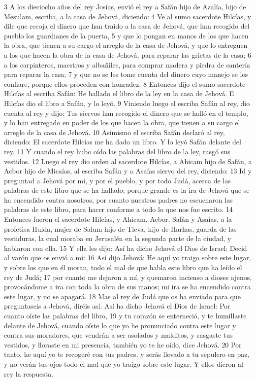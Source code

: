 3 A los dieciocho años del rey Josías, envió el rey a Safán hijo de Azalía, hijo de Mesulam, escriba, a la casa de Jehová, diciendo:
4 Ve al sumo sacerdote Hilcías, y dile que recoja el dinero que han traído a la casa de Jehová, que han recogido del pueblo los guardianes de la puerta,
5 y que lo pongan en manos de los que hacen la obra, que tienen a su cargo el arreglo de la casa de Jehová, y que lo entreguen a los que hacen la obra de la casa de Jehová, para reparar las grietas de la casa;
6 a los carpinteros, maestros y albañiles, para comprar madera y piedra de cantería para reparar la casa;
7 y que no se les tome cuenta del dinero cuyo manejo se les confiare, porque ellos proceden con honradez.
8 Entonces dijo el sumo sacerdote Hilcías al escriba Safán: He hallado el libro de la ley en la casa de Jehová. E Hilcías dio el libro a Safán, y lo leyó.
9 Viniendo luego el escriba Safán al rey, dio cuenta al rey y dijo: Tus siervos han recogido el dinero que se halló en el templo, y lo han entregado en poder de los que hacen la obra, que tienen a su cargo el arreglo de la casa de Jehová.
10 Asimismo el escriba Safán declaró al rey, diciendo: El sacerdote Hilcías me ha dado un libro. Y lo leyó Safán delante del rey.
11 Y cuando el rey hubo oído las palabras del libro de la ley, rasgó sus vestidos.
12 Luego el rey dio orden al sacerdote Hilcías, a Ahicam hijo de Safán, a Acbor hijo de Micaías, al escriba Safán y a Asaías siervo del rey, diciendo:
13 Id y preguntad a Jehová por mí, y por el pueblo, y por todo Judá, acerca de las palabras de este libro que se ha hallado; porque grande es la ira de Jehová que se ha encendido contra nosotros, por cuanto nuestros padres no escucharon las palabras de este libro, para hacer conforme a todo lo que nos fue escrito.
14 Entonces fueron el sacerdote Hilcías, y Ahicam, Acbor, Safán y Asaías, a la profetisa Hulda, mujer de Salum hijo de Ticva, hijo de Harhas, guarda de las vestiduras, la cual moraba en Jerusalén en la segunda parte de la ciudad, y hablaron con ella.
15 Y ella les dijo: Así ha dicho Jehová el Dios de Israel: Decid al varón que os envió a mí:
16 Así dijo Jehová: He aquí yo traigo sobre este lugar, y sobre los que en él moran, todo el mal de que habla este libro que ha leído el rey de Judá;
17 por cuanto me dejaron a mí, y quemaron incienso a dioses ajenos, provocándome a ira con toda la obra de sus manos; mi ira se ha encendido contra este lugar, y no se apagará.
18 Mas al rey de Judá que os ha enviado para que preguntaseis a Jehová, diréis así: Así ha dicho Jehová el Dios de Israel: Por cuanto oíste las palabras del libro,
19 y tu corazón se enterneció, y te humillaste delante de Jehová, cuando oíste lo que yo he pronunciado contra este lugar y contra sus moradores, que vendrán a ser asolados y malditos, y rasgaste tus vestidos, y lloraste en mi presencia, también yo te he oído, dice Jehová.
20 Por tanto, he aquí yo te recogeré con tus padres, y serás llevado a tu sepulcro en paz, y no verán tus ojos todo el mal que yo traigo sobre este lugar. Y ellos dieron al rey la respuesta.

